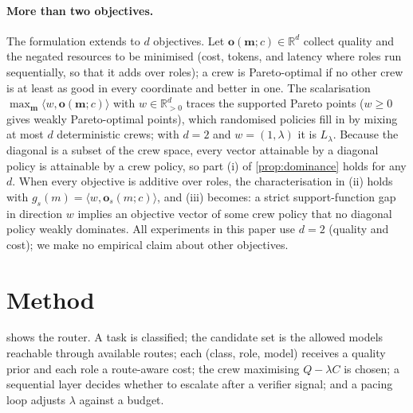 \documentclass[11pt,a4paper]{article}
\theoremstyle{definition}
\theoremstyle{remark}
\theoremstyle{definition}
\newcommand{\R}{\mathbb{R}}
\newcommand{\crew}{\mathbf{m}}
\begin{document}
\paragraph{More than two objectives.} The formulation extends to $d$ objectives. Let $\mathbf o(\crew;c)\in\R^d$ collect quality and the negated resources to be minimised (cost, tokens, and latency where roles run sequentially, so that it adds over roles); a crew is Pareto-optimal if no other crew is at least as good in every coordinate and better in one. The scalarisation $\max_\crew\langle w,\mathbf o(\crew;c)\rangle$ with $w\in\R^d_{>0}$ traces the supported Pareto points ($w\ge0$ gives weakly Pareto-optimal points), which randomised policies fill in by mixing at most $d$ deterministic crews; with $d=2$ and $w=(1,\lambda)$ it is $L_\lambda$. Because the diagonal is a subset of the crew space, every vector attainable by a diagonal policy is attainable by a crew policy, so part (i) of \cref{prop:dominance} holds for any $d$. When every objective is additive over roles, the characterisation in (ii) holds with $g_s(m)=\langle w,\mathbf o_s(m;c)\rangle$, and (iii) becomes: a strict support-function gap in direction $w$ implies an objective vector of some crew policy that no diagonal policy weakly dominates. All experiments in this paper use $d=2$ (quality and cost); we make no empirical claim about other objectives.

\section{Method}
\label{sec:method}

 shows the router. A task is classified; the candidate set is the allowed models reachable through available routes; each (class, role, model) receives a quality prior and each role a route-aware cost; the crew maximising $Q-\lambda C$ is chosen; a sequential layer decides whether to escalate after a verifier signal; and a pacing loop adjusts $\lambda$ against a budget.
\end{document}

